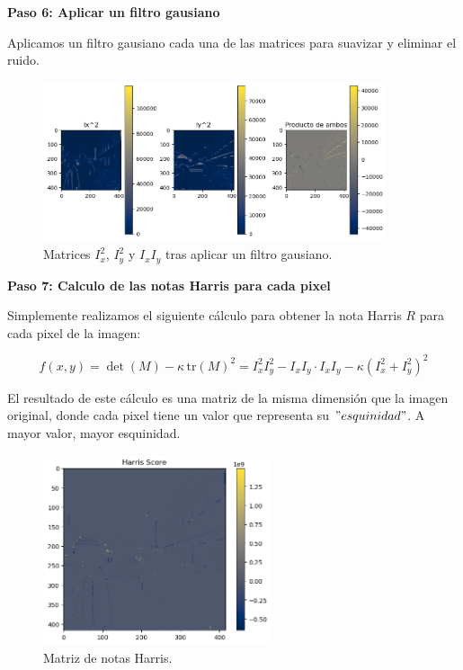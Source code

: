 \documentclass[a4paper]{article}
\begin{document}
\par\vspace{0.5cm}
\textbf{Paso 6: Aplicar un filtro gausiano}
\par\vspace{0.5cm}

Aplicamos un filtro gausiano cada una de las matrices para suavizar y eliminar el ruido.

\begin{figure}[H]
    \centering
    \includegraphics[width=0.9\textwidth]{images/harris_paso_5.png}
    \caption{Matrices \(I_x^2\), \(I_y^2\) y \(I_xI_y\) tras aplicar un filtro gausiano.}
\end{figure}

\par\vspace{0.5cm}
\textbf{Paso 7: Calculo de las notas Harris para cada pixel}
\par\vspace{0.5cm}

Simplemente realizamos el siguiente cálculo para obtener la nota Harris \(R\) para cada pixel de la imagen:
\par\vspace{0.3cm}
\[
f(x, y) = \det(M) - \kappa \, \text{tr}(M)^2 = I_x^2 I_y^2 - I_xI_y \cdot I_xI_y - \kappa (I_x^2 + I_y^2)^2
\]
\par\vspace{0.3cm}
El resultado de este cálculo es una matriz de la misma dimensión que la imagen original, donde cada pixel tiene un valor que representa su \("esquinidad"\). A mayor valor, mayor esquinidad.

\begin{figure}[H]
    \centering
    \includegraphics[width=0.6\textwidth]{images/harris_paso_6.png}
    \caption{Matriz de notas Harris.}
\end{figure}
\end{document}
